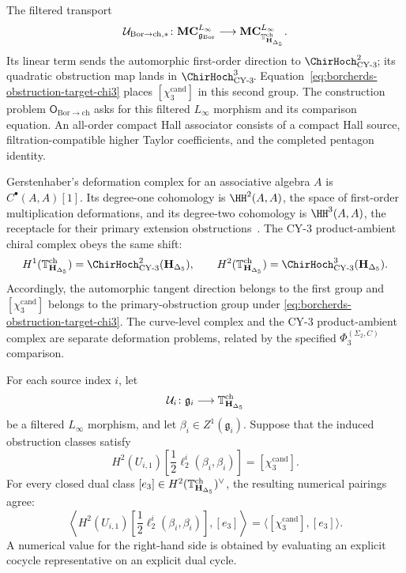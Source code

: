 \begin{remark}
\label{rem:chirhoch3-six-paths}
The filtered transport
\[
 \mathcal U_{\mathrm{Bor}\to\mathrm{ch},*}\colon
 \mathbf{MC}^{L_\infty}_{\mathfrak g_{\mathrm{Bor}}}\longrightarrow
 \mathbf{MC}^{L_\infty}_{\mathbb T_{\mathbf H_{\Delta_5}}^{\mathrm{ch}}}.
\]
Its linear term sends the automorphic first-order direction to
\(\ChirHoch^2_{\mathrm{CY\text{-}3}\!}\); its quadratic obstruction
map lands in
\(\ChirHoch^3_{\mathrm{CY\text{-}3}\!}\).
Equation~\eqref{eq:borcherds-obstruction-target-chi3} places
\([\chi_3^{\mathrm{cand}}]\) in this second group.  The construction
problem \(\mathsf O_{\mathrm{Bor}\to\mathrm{ch}}\) asks for this
filtered \(L_\infty\) morphism and its comparison equation.  An
all-order compact Hall associator consists of a compact Hall source,
filtration-compatible higher Taylor coefficients, and the completed
pentagon identity.
\end{remark}

\begin{remark}
\label{rem:chirhoch3-derived-vs-classical}
Gerstenhaber's deformation complex for an associative algebra \(A\)
is \(C^\bullet(A,A)[1]\).  Its degree-one cohomology is
\(\HH^2(A,A)\), the space of first-order multiplication
deformations, and its degree-two cohomology is \(\HH^3(A,A)\), the
receptacle for their primary extension obstructions~\cite{Ger63}.
The CY-\(3\) product-ambient chiral complex obeys the
same shift:
\[
 H^1(\TangCplx_{\mathbf H_{\Delta_5}}^{\mathrm{ch}})
 =\ChirHoch^2_{\mathrm{CY\text{-}3}}(\mathbf H_{\Delta_5}),
 \qquad
 H^2(\TangCplx_{\mathbf H_{\Delta_5}}^{\mathrm{ch}})
 =\ChirHoch^3_{\mathrm{CY\text{-}3}}(\mathbf H_{\Delta_5}).
\]
Accordingly, the automorphic tangent direction belongs to the first
group and \([\chi_3^{\mathrm{cand}}]\) belongs to the
primary-obstruction group under
\eqref{eq:borcherds-obstruction-target-chi3}.
The curve-level complex and the CY-\(3\) product-ambient complex are
separate deformation problems, related by the specified
\(\Phi_3^{(\Sigma_2,C)}\) comparison.
\end{remark}

\begin{corollary}
\label{cor:chirhoch3-six-fold-confirmation}
\ClaimStatusConditional
For each source index \(i\), let
\[
 \mathcal U_i\colon\mathfrak g_i\longrightarrow
 \mathbb T_{\mathbf H_{\Delta_5}}^{\mathrm{ch}}
\]
be a filtered $L_\infty$ morphism, and let
\(\beta_i\in Z^1(\mathfrak g_i)\).  Suppose that the induced obstruction
classes satisfy
\begin{equation}
\label{eq:chirhoch3-six-fold-value}
 H^2(U_{i,1})
 \left[\frac12\ell_2^i(\beta_i,\beta_i)\right]
 =[\chi_3^{\mathrm{cand}}].
\end{equation}
For every closed dual class
$[e_3]\in H^2(\mathbb T_{\mathbf H_{\Delta_5}}^{\mathrm{ch}})^\vee$,
the resulting numerical pairings agree:
\[
 \left\langle
 H^2(U_{i,1})
 \left[\frac12\ell_2^i(\beta_i,\beta_i)\right],
 [e_3]\right\rangle
 =\langle[\chi_3^{\mathrm{cand}}],[e_3]\rangle.
\]
A numerical value for the right-hand side is obtained by evaluating an
explicit cocycle representative on an explicit dual cycle.
\end{corollary}

